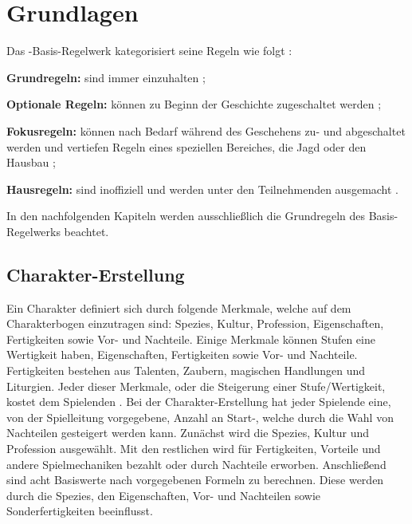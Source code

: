 \section{Grundlagen}\label{sec:grundlagen}

Das -Basis-Regelwerk kategorisiert seine Regeln wie folgt :
\begin{inparaenum}[\bfseries(a)]
    \item \textbf{Grundregeln:} sind immer einzuhalten ;
    \item \textbf{Optionale Regeln:} können zu Beginn der Geschichte zugeschaltet werden ;
    \item \textbf{Fokusregeln:} können nach Bedarf während des Geschehens zu- und abgeschaltet werden und vertiefen Regeln eines speziellen Bereiches, \zB die Jagd oder den Hausbau ;
    \item \textbf{Hausregeln:} sind inoffiziell und werden unter den Teilnehmenden ausgemacht .
\end{inparaenum}
In den nachfolgenden Kapiteln werden ausschließlich die Grundregeln des Basis-Regelwerks beachtet.


\subsection{Charakter-Erstellung}\label{subsec:charakter-erstellung}

Ein Charakter definiert sich durch folgende Merkmale, welche auf dem Charakterbogen einzutragen sind: Spezies, Kultur, Profession, Eigenschaften, Fertigkeiten sowie Vor- und Nachteile.
Einige Merkmale können Stufen \bzw eine Wertigkeit haben, \uA Eigenschaften, Fertigkeiten sowie Vor- und Nachteile.
Fertigkeiten bestehen aus Talenten, Zaubern, magischen Handlungen und Liturgien.
Jeder dieser Merkmale, oder die Steigerung einer Stufe/Wertigkeit, kostet dem Spielenden .
Bei der Charakter-Erstellung hat jeder Spielende eine, von der Spielleitung vorgegebene, Anzahl an Start-, welche durch die Wahl von Nachteilen gesteigert werden kann.
Zunächst wird die Spezies, Kultur und Profession ausgewählt.
Mit den restlichen  wird für Fertigkeiten, Vorteile und andere Spielmechaniken bezahlt oder durch Nachteile erworben.
Anschließend sind acht Basiswerte nach vorgegebenen Formeln zu berechnen.
Diese werden \ggf durch die Spezies, den Eigenschaften, Vor- und Nachteilen sowie Sonderfertigkeiten beeinflusst.

